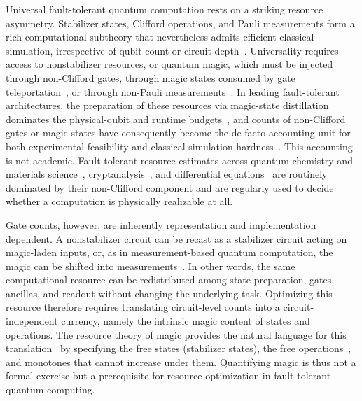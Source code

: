 \documentclass[aps,pra,superscriptaddress,twocolumn,longbibliography]{revtex4-2}
\begin{document}
Universal fault-tolerant quantum computation rests on a striking resource asymmetry. Stabilizer states, Clifford operations, and Pauli measurements form a rich computational subtheory that nevertheless admits efficient classical simulation, irrespective of qubit count or circuit depth~\cite{Gottesman/Stabilizer_Dynamics/1998,Aronsson_gottesman/Tableau/2004}. 
Universality requires access to nonstabilizer resources, or quantum magic, which must be injected through non-Clifford gates, through magic states consumed by gate teleportation~\cite{Bravyi/magic_universality/2005,Gottesman/UniversalQC_teleportation/1999}, or through non-Pauli measurements~\cite{Li/magic_injection_measurements/2024}. In leading fault-tolerant architectures, the preparation of these resources via magic-state distillation dominates the physical-qubit and runtime budgets~\cite{Bravyi/magic_universality/2005,Bravyi2012Nov,Fowler2013Jun,Campbell/FTQC_MSD/2017,Gidney2019Apr,Litinski2019Mar,Litinski2019Dec,Zheng2025Sep,Wills2025Nov,Ruiz2026Feb}, and counts of non-Clifford gates or magic states have consequently become the de facto accounting unit for both experimental feasibility and classical-simulation hardness~\cite{Bravyi/Clifford_plus_T/2016,Bravyi/stab_fidelity/2019,KissingerWetering2020,Monaco2025Sep,Kook2026Jun}. This accounting is not academic. Fault-tolerant resource estimates across quantum chemistry and materials science~\cite{ReiherEtAl2017,Babbush/electronic_spectra/2018,BerryEtAl2019Qubitization,VonBurgEtAl2021Catalysis,SuEtAl2021FirstQuant,LeeEtAl2021THC,KimEtAl2022Battery,SteudtnerEtAl2023Observables,KivlichanEtAl2020Condensed,RubinEtAl2023Bloch,KanSymons2025Hubbard,BaySmidtEtAl2025GeneralizedHubbard,BakerEtAl2024SpinDefects,CasaresEtAl2026ODMR,Naranjo2026}, cryptanalysis~\cite{RoettelerEtAl2017ECDLP,GidneyEkera2021,GouzienEtAl2023ECC,GarnKan2025BinaryECC}, and differential equations~\cite{ChildsLiuOstrander2021PDE,PenuelEtAl2024CFD,DemirdjianEtAl2026Burgers} are routinely dominated by their non-Clifford component and are regularly used to decide whether a computation is physically realizable at all.

Gate counts, however, are inherently representation and implementation dependent. A nonstabilizer circuit can be recast as a stabilizer circuit acting on magic-laden inputs, or, as in measurement-based quantum computation, the magic can be shifted into measurements~\cite{Raussendorf/One-wayQC/2001,Briegel2009Jan}. In other words, the same computational resource can be redistributed among state preparation, gates, ancillas, and readout without changing the underlying task. Optimizing this resource therefore requires translating circuit-level counts into a circuit-independent currency, namely the intrinsic magic content of states and operations. The resource theory of magic provides the natural language for this translation~\cite{Veitch_2014,VeitchEtAl2012Negativity,RevModPhys.91.025001} by specifying the free states (stabilizer states), the free operations~\cite{Veitch_2014,PhysRevA.97.062332,Seddon2019Jul,PhysRevA.106.042422}, and monotones that cannot increase under them. Quantifying magic is thus not a formal exercise but a prerequisite for resource optimization in fault-tolerant quantum computing.
\end{document}
